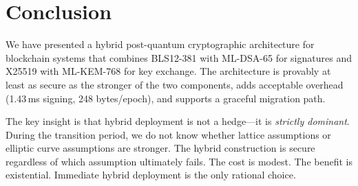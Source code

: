 \section{Conclusion}


We have presented a hybrid post-quantum cryptographic architecture for blockchain
systems that combines BLS12-381 with ML-DSA-65 for signatures and X25519 with
ML-KEM-768 for key exchange. The architecture is provably at least as secure as the
stronger of the two components, adds acceptable overhead (1.43\,ms signing, 248
bytes/epoch), and supports a graceful migration path.

The key insight is that hybrid deployment is not a hedge---it is \emph{strictly
dominant}. During the transition period, we do not know whether lattice assumptions
or elliptic curve assumptions are stronger. The hybrid construction is secure
regardless of which assumption ultimately fails. The cost is modest. The benefit
is existential. Immediate hybrid deployment is the only rational choice.

